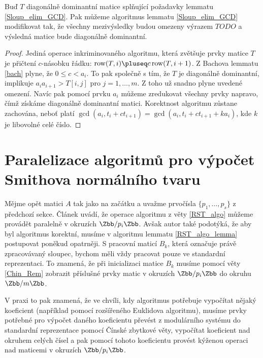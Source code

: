 \begin{lem}
Buď $ T $ diagonálně dominantní matice splňující požadavky lemmatu \ref{Sloup_elim_GCD}.
Pak můžeme algoritmus lemmatu \ref{Sloup_elim_GCD} modifikovat tak, že všechny
mezivýsledky budou omezeny výrazem $ TODO $ a výsledná matice bude diagonálně
dominantní.
\end{lem}
\begin{proof}
Jediná operace inkriminovaného algoritmu, která zvětšuje prvky matice $ T $ je
přičtení $ c $-násobku řádku: $ \operatorname{row}(T, i) \pluseq c \operatorname{row}(T, i + 1) $.
Z Bachova lemmatu \ref{bach} plyne, že $ 0 \leq c < a_i $. To pak společně s
tím, že $ T $ je diagonálně dominantní, implikuje $ a_i a_{i+1} > T[i, j] $ pro
$ j = 1, \dots, m $. Z toho už snadno plyne uvedené omezení. Navíc pak pomocí prvku
$ a_i $ můžeme zredukovat všechny prvky napravo, čímž získáme diagonálně dominantní
matici. Korektnost algoritmu zůstane zachována, neboť platí
$ \gcd(a_i, t_{i} + ct_{i+1}) = \gcd(a_i, t_{i} + ct_{i+1} + k a_i) $,
kde $ k $ je libovolné celé číslo.
\end{proof}


\section{Paralelizace algoritmů pro výpočet Smithova normálního tvaru}
Mějme opět matici $ A $ tak jako na začátku a uvažme prvočísla
$ \{ p_1, \dots, p_s \} $ z předchozí sekce. Článek \cite[Theorem 16]{triang}
uvádí, že operace algoritmu z věty \ref{RST_algo} můžeme provádět paralelně
v okruzích $ \Zbb / p_i \Zbb $. Avšak autor také podotýká, že aby byl algoritmus
korektní, musíme v algoritmu lemmatu \ref{RST_algo_lemma} postupovat poněkud
opatrněji. S pracovní maticí $ B_k $, která označuje právě zpracovávaný sloupec,
bychom měli vždy pracovat pouze ve standardní reprezentaci. To znamená, že při
inicializaci matice $ B_k $ musíme pomocí věty \ref{Chin_Rem} zobrazit příslušné
prvky matic v okruzích $ \Zbb / p_i \Zbb $ do okruhu $ \Zbb / m \Zbb $.

V praxi to pak znamená, že ve chvíli, kdy algoritmus potřebuje vypočítat nějaký
koeficient (například pomocí rozšířeného Euklidova algoritmu), musíme prvky
potřebné pro výpočet daného koeficientu převést z modulárního systému do standardní
reprezentace pomocí Čínské zbytkové věty, vypočítat koeficient nad okruhem celých
čísel a pak pomocí tohoto koeficientu provést kýženou operaci nad maticemi v
okruzích $ \Zbb / p_i \Zbb $.

